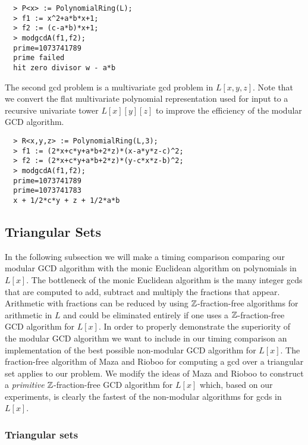 \documentclass[10pt]{article}
\begin{document}
{ \small
\begin{verbatim}
  > P<x> := PolynomialRing(L);
  > f1 := x^2+a*b*x+1;
  > f2 := (c-a*b)*x+1;
  > modgcdA(f1,f2);
  prime=1073741789
  prime failed
  hit zero divisor w - a*b
\end{verbatim}
}

\noindent
The second gcd problem is a multivariate gcd problem in $L[x,y,z]$.
Note that we convert the flat multivariate polynomial representation used for input
to a recursive univariate tower $L[x][y][z]$ to improve
the efficiency of the modular GCD algorithm.

{ \small
\begin{verbatim}
  > R<x,y,z> := PolynomialRing(L,3);
  > f1 := (2*x+c*y+a*b+2*z)*(x-a*y*z-c)^2;
  > f2 := (2*x+c*y+a*b+2*z)*(y-c*x*z-b)^2;
  > modgcdA(f1,f2);
  prime=1073741789
  prime=1073741783
  x + 1/2*c*y + z + 1/2*a*b
\end{verbatim}
}

 


\subsection{Triangular Sets}

In the following subsection we will make a timing comparison
comparing our modular GCD algorithm with the monic Euclidean
algorithm on polynomials in $L[x]$. The bottleneck of the monic
Euclidean algorithm is the many integer gcds that are computed to
add, subtract and multiply the fractions that appear. Arithmetic
with fractions can be reduced by using ${\mathbb Z}$-fraction-free
algorithms for arithmetic in $L$ and could be eliminated entirely if
one uses a ${\mathbb Z}$-fraction-free GCD algorithm for $L[x]$. In order to
properly demonstrate the superiority of the modular GCD algorithm we
want to include in our timing comparison an implementation of the
best possible non-modular GCD algorithm for $L[x].$ The
fraction-free algorithm of Maza and Rioboo \cite{Maza} for computing
a gcd over a triangular set applies to our problem. We modify the
ideas of Maza and Rioboo to construct a {\it primitive}
${\mathbb Z}$-fraction-free GCD algorithm for $L[x]$ which, based on our
experiments, is clearly the fastest of the non-modular algorithms
for gcds in $L[x]$.






\subsubsection*{Triangular sets}
\end{document}
